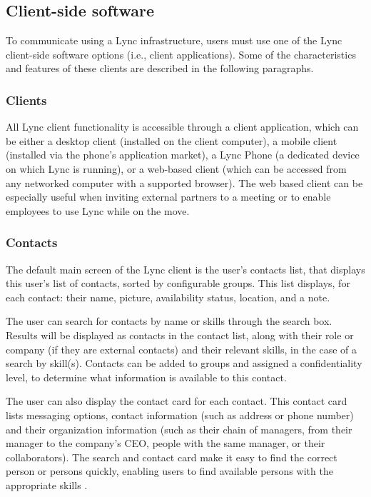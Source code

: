 \subsection{Client-side software}

To communicate using a Lync infrastructure, users must use one of the Lync client-side software options (i.e., client applications). Some of the characteristics and features of these clients are described in the following paragraphs.

\subsubsection{Clients}
All Lync client functionality is accessible through a client application, which can be either a desktop client (installed on the client computer), a mobile client (installed via the phone's application market), a Lync Phone (a dedicated device on which Lync is running), or a web-based client (which can be accessed from any networked computer with a supported browser\cite{microsoft_technet_lync_2013-1}). The web based client can be especially useful when inviting external partners to a meeting or to enable employees to use Lync while on the move\cite[Ch. 1.1]{winters_mastering_2012}.

\subsubsection{Contacts}
The default main screen of the Lync client is the user's contacts list, that displays this user's list of contacts, sorted by configurable groups. This list displays, for each contact: their name, picture, availability status, location, and a note.

The user can search for contacts by name or skills through the search box. Results will be displayed as contacts in the contact list, along with their role or company (if they are external contacts) and their relevant skills, in the case of a search by skill(s). Contacts can be added to groups and assigned a confidentiality level, to determine what information is available to this contact.

The user can also display the contact card for each contact. This contact card lists messaging options, contact information (such as address or phone number) and their organization information (such as their chain of managers, from their manager to the company's CEO, people with the same manager, or their collaborators). The search and contact card make it easy to find the correct person or persons quickly, enabling users to find available persons with the appropriate skills
\cite[Ch. 1.1]{winters_mastering_2012}.

